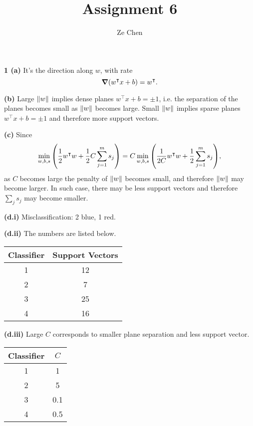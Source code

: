 \documentclass{article}
\title{Assignment 6}
\author{Ze Chen}
\makeatletter
\newcommand*{\shifttext}[1]{%
  \settowidth{\@tempdima}{#1}%
  \hspace{-\@tempdima}#1%
}
\newcommand{\plabel}[1]{%
\shifttext{\textbf{#1}\quad}%
}
\makeatother
\begin{document}
\maketitle

\plabel{1 (a)}%
It's the direction along $w$, with rate
\[ \grad (w^\intercal x + b) = w^\intercal. \]

\plabel{(b)}%
Large $\norm{w}$ implies dense planes $w^\intercal x + b = \pm 1$, i.e. the separation of the planes becomes small as $\norm{w}$ becomes large.
Small $\norm{w}$ implies sparse planes $w^\intercal x + b = \pm 1$ and therefore more support vectors.

\plabel{(c)}%
Since
\[ \min_{w,b,s} \qty(\frac{1}{2} w^\intercal w + \frac{1}{2} C \sum_{j=1}^m s_j) = C \min_{w,b,s} \qty(\frac{1}{2C} w^\intercal w + \frac{1}{2} \sum_{j=1}^m s_j), \]
as $C$ becomes large the penalty of $\norm{w}$ becomes small, and therefore $\norm{w}$ may become larger.
In such case, there may be less support vectors and therefore $\sum_j s_j$ may become smaller.

\plabel{(d.i)}%
Misclassification: 2 blue, 1 red.

\plabel{(d.ii)}%
The numbers are listed below.
\begin{center}
    \begin{tabular}{cc}
        \toprule
        Classifier & Support Vectors \\
        \midrule
        \num{1} & \num{12} \\
        \num{2} & \num{7} \\
        \num{3} & \num{25} \\
        \num{4} & \num{16} \\
        \bottomrule
    \end{tabular}
\end{center}

\plabel{(d.iii)}%
Large $C$ corresponds to smaller plane separation and less support vector.
\begin{center}
    \begin{tabular}{cc}
        \toprule
        Classifier & $C$ \\
        \midrule
        \num{1} & \num{1} \\
        \num{2} & \num{5} \\
        \num{3} & \num{0.1} \\
        \num{4} & \num{0.5} \\
        \bottomrule
    \end{tabular}
\end{center}
\end{document}

